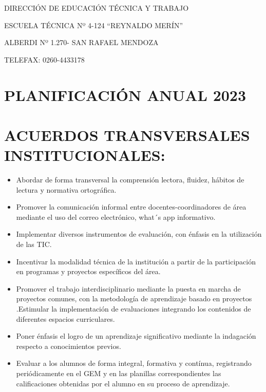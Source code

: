 \documentclass[../main]{subfiles}
\begin{document}
\pagestyle{empty}
\setcounter{chapter}{1}

\newpage
\begin{center}
DIRECCIÓN DE EDUCACIÓN TÉCNICA Y TRABAJO

ESCUELA TÉCNICA Nº 4-124 “REYNALDO MERÍN”

ALBERDI Nº 1.270- SAN RAFAEL MENDOZA

TELEFAX: 0260-4433178

\section{PLANIFICACIÓN ANUAL 2023}

\end{center}

\section{ACUERDOS TRANSVERSALES INSTITUCIONALES:}
\begin{itemize}
\item Abordar de forma transversal la comprensión lectora, fluidez, hábitos de lectura y normativa ortográfica.
\item Promover la comunicación informal entre docentes-coordinadores de área mediante el uso del correo electrónico, what´s app informativo.
\item Implementar diversos instrumentos de evaluación, con énfasis en la utilización de las TIC.
\item Incentivar la modalidad técnica de la institución a partir de la participación en programas y proyectos específicos del área.
\item Promover el trabajo interdisciplinario mediante la puesta en marcha de proyectos comunes, con la metodología de aprendizaje basado en proyectos .Estimular la implementación de
evaluaciones integrando los contenidos de diferentes espacios curriculares.
\item Poner énfasis el logro de un aprendizaje significativo mediante la indagación respecto a conocimientos previos.
\item Evaluar a los alumnos de forma integral, formativa y contínua, registrando periódicamente en el GEM y en las planillas correspondientes las calificaciones obtenidas por el alumno en su
proceso de aprendizaje.
\end{itemize}
\end{document}

